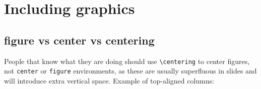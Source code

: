 \documentclass[9pt,english]{Beamer_PROMES}\uselanguage{English}\languagepath{English}
\begin{document}
\section{Including graphics}
\subsection{figure vs center vs centering}
\begin{frame}[fragile]%

People that know what they are doing should use \verb=\centering= to center figures, not \verb=center= or \verb=figure= environments, as these are usually superfluous in slides and will introduce extra vertical space. Example of top-aligned columns:

\vspace{3mm}
\begin{columns}[t,onlytextwidth]
   \centering
\end{columns}
\vspace{3mm}


\end{frame}
\end{document}
